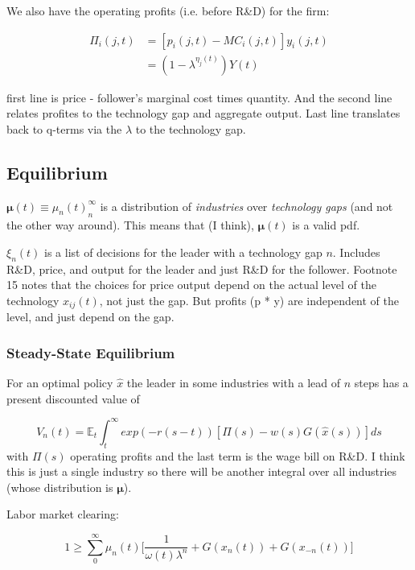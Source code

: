 \documentclass[11pt]{article}
\begin{document}
  We also have the operating profits (i.e. before R\&D) for the firm:
  
  \begin{align*} \label{eq:profits}
    \Pi_i(j, t) &= [p_i(j, t) - MC_i(j, t)]y_i(j, t)\\
                &= (1 - \lambda^{\eta_j(t)})Y(t)
  \end{align*}

  first line is price -  follower's marginal cost times quantity.  And the second line relates profites to the technology gap and aggregate output.  Last line translates back to q-terms via the $\lambda$ to the technology gap.

\subsection{Equilibrium}
\label{sub:equilibrium}
  $\bm{\mu}(t) \equiv {\mu_n(t)}_n^\infty$ is a distribution of \emph{industries} over \emph{technology gaps} (and not the other way around).  This means that (I think), $\bm{\mu}(t)$ is a valid pdf.

  $\xi_n(t)$ is a list of decisions for the leader with a technology gap $n$.  Includes R\&D, price, and output for the leader and just R\&D for the follower.  Footnote 15 notes that the choices for price output depend on the actual level of the technology $x_{ij}(t)$, not just the gap.  But profits (p * y) are independent of the level, and just depend on the gap.

  \subsubsection{Steady-State Equilibrium}
  \label{subsub:steady_state_equilibrium}
  For an optimal policy $\hat{x}$ the leader in some industries with a lead of $n$ steps has a present discounted value of 

  \begin{equation}
    V_n(t) = \mathbb{E}_t \int_{t}^{\infty} exp(-r(s - t))[\Pi(s) - w(s)G(\hat{x}(s))]ds
  \end{equation}
  with $\Pi(s)$ operating profits and the last term is the wage bill on R\&D.  I think this is just a single industry so there will be another integral over all industries (whose distribution is $\bm{\mu}$).

  Labor market clearing:

  \begin{equation} \label{eq:labor_clearing}
    1 \geq \sum_0^{\infty} \mu_n(t) \Big[\frac{1}{\omega(t)\lambda^n} + G(x_n(t)) + G(x_{-n}(t))\Big]
  \end{equation}
\end{document}
